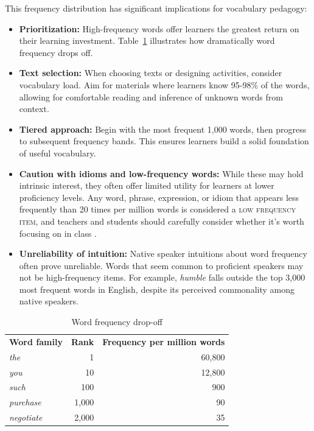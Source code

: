 This frequency distribution has significant implications for vocabulary pedagogy:

\begin{itemize}
    \item \textbf{Prioritization:} High-frequency words offer learners the greatest return on their learning investment. Table~\ref{tab:word-frequency} illustrates how dramatically word frequency drops off.
    
    \item \textbf{Text selection:} When choosing texts or designing activities, consider vocabulary load. Aim for materials where learners know 95-98\% of the words, allowing for comfortable reading and inference of unknown words from context.
    
    \item \textbf{Tiered approach:} Begin with the most frequent 1,000 words, then progress to subsequent frequency bands. This ensures learners build a solid foundation of useful vocabulary.
    
    \item \textbf{Caution with idioms and low-frequency words:} While these may hold intrinsic interest, they often offer limited utility for learners at lower proficiency levels. Any word, phrase, expression, or idiom that appears less frequently than 20 times per million words is considered a \textsc{low frequency item}, and teachers and students should carefully consider whether it's worth focusing on in class \citep{Nation2013}.
    
    \item \textbf{Unreliability of intuition:} Native speaker intuitions about word frequency often prove unreliable. Words that seem common to proficient speakers may not be high-frequency items. For example, \textit{humble} falls outside the top 3,000 most frequent words in English, despite its perceived commonality among native speakers.
\end{itemize}

\begin{table}[ht]
\centering
\caption{Word frequency drop-off}
\label{tab:word-frequency}
\begin{tabular}{lrr}
\textbf{Word family} & \textbf{Rank} & \textbf{Frequency per million words} \\
\textit{the} & 1 & 60,800 \\
\textit{you} & 10 & 12,800 \\
\textit{such} & 100 & 900 \\
\textit{purchase} & 1,000 & 90 \\
\textit{negotiate} & 2,000 & 35 \\
\end{tabular}
\end{table}

